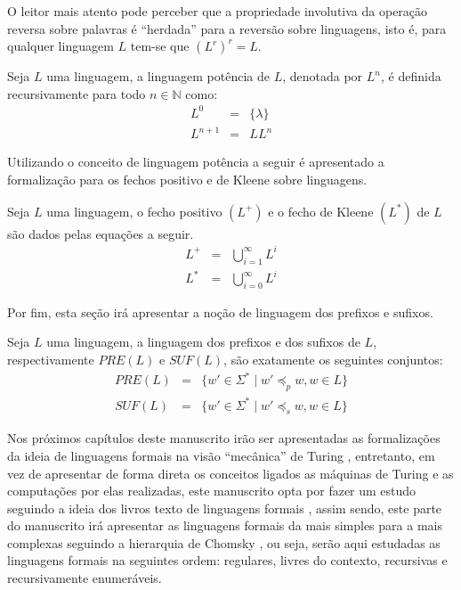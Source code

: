 O leitor mais atento pode perceber que a propriedade involutiva da operação reversa sobre palavras é ``herdada'' para a reversão sobre linguagens, isto é, para qualquer linguagem $L$ tem-se que $(L^r)^r = L$. 

\begin{definicao}
	Seja $L$ uma linguagem, a linguagem potência de $L$, denotada por $L^n$, é definida recursivamente para todo $n \in \mathbb{N}$ como:
	\begin{eqnarray}
		L^0 & = &\{\lambda\}\\
		L^{n+1} & = &  LL^{n}
	\end{eqnarray}
\end{definicao}

Utilizando o conceito de linguagem potência a seguir é apresentado a formalização para os fechos positivo e de Kleene sobre linguagens.

\begin{definicao}\label{def:FechoPositivoKleeneLinguagem}
	Seja $L$ uma linguagem, o fecho positivo $(L^+)$ e o fecho de Kleene $(L^*)$ de $L$ são dados pelas equações a seguir.
	\begin{eqnarray}
		L^+ & = & \bigcup_{i = 1}^\infty L^i\\
		L^* & = & \bigcup_{i = 0}^\infty L^i
	\end{eqnarray}
\end{definicao}

Por fim, esta seção irá apresentar a noção de linguagem dos prefixos e sufixos.

\begin{definicao}\label{def:LinguagemPrefixosSufixos}
	Seja $L$ uma linguagem, a linguagem dos prefixos e dos sufixos de $L$, respectivamente $PRE(L)$ e $SUF(L)$, são exatamente os seguintes conjuntos:
	\begin{eqnarray*}
		PRE(L) & = & \{w' \in \Sigma^* \mid w' \preceq_p w, w \in L\}\\
		SUF(L) & = & \{w' \in \Sigma^* \mid w' \preceq_s w, w \in L\}
	\end{eqnarray*}
\end{definicao}

Nos próximos capítulos deste manuscrito irão ser apresentadas as formalizações da ideia de linguagens formais na visão ``mecânica'' de Turing \cite{turing1937}, entretanto, em vez de apresentar de forma direta os conceitos ligados as máquinas de Turing e as computações por elas realizadas, este manuscrito opta por fazer um estudo seguindo a ideia dos livros texto de linguagens formais \cite{benjaLivro2010, linz2006, menezes1998LFA}, assim sendo, este parte do manuscrito irá apresentar as linguagens formais da mais simples para a mais complexas seguindo a hierarquia de Chomsky \cite{chomsky1956}, ou seja, serão aqui estudadas as linguagens formais na seguintes ordem: regulares, livres do contexto, recursivas e recursivamente enumeráveis.

